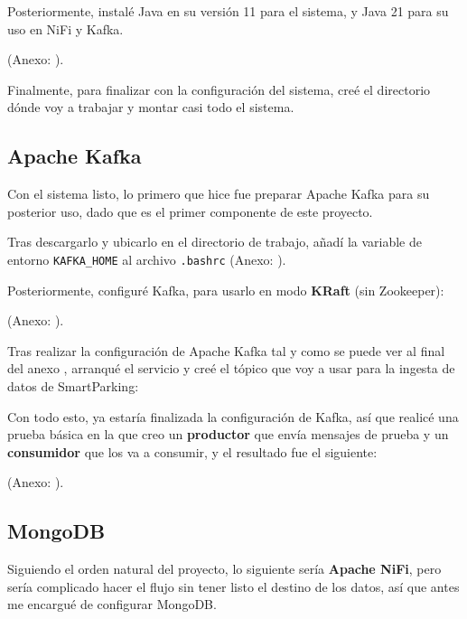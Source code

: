 \documentclass{../../../miPlantilla}
\begin{document}
Posteriormente, instalé Java en su versión 11 para el sistema, y Java 21 para su uso en NiFi y Kafka.
\begin{center}
  {\small(Anexo: )}.
\end{center}

Finalmente, para finalizar con la configuración del sistema, creé el directorio dónde voy a trabajar y montar casi todo el sistema.

\subsection{Apache Kafka}
Con el sistema listo, lo primero que hice fue preparar Apache Kafka para su posterior uso, dado que es el primer componente de este proyecto.

Tras descargarlo y ubicarlo en el directorio de trabajo, añadí la variable de entorno \texttt{KAFKA\_HOME} al archivo \texttt{.bashrc} {\small(Anexo: )}.

\newpage

Posteriormente, configuré Kafka, para usarlo en modo \textbf{KRaft} (sin Zookeeper):
\begin{center}
  {\small(Anexo: )}.
\end{center}

Tras realizar la configuración de Apache Kafka tal y como se puede ver al final del anexo , arranqué el servicio y
creé el tópico que voy a usar para la ingesta de datos de SmartParking:

Con todo esto, ya estaría finalizada la configuración de Kafka, así que realicé una prueba básica en la que creo un \textbf{productor}
que envía mensajes de prueba y un \textbf{consumidor} que los va a consumir, y el resultado fue el siguiente:
\begin{center}
  {\small(Anexo: )}.
\end{center}

\subsection{MongoDB}
Siguiendo el orden natural del proyecto, lo siguiente sería \textbf{Apache NiFi}, pero sería complicado hacer el flujo sin tener listo el destino de los datos,
así que antes me encargué de configurar MongoDB.
\end{document}
